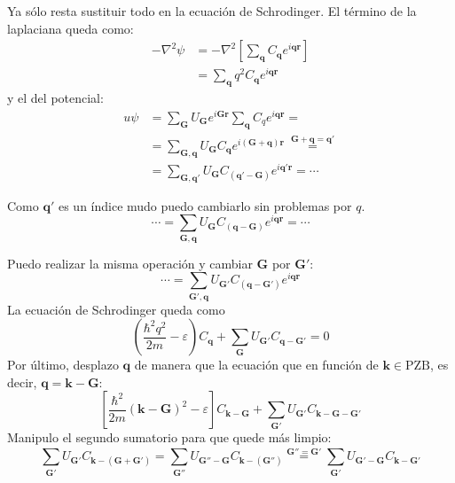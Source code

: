 Ya sólo resta sustituir todo en la ecuación de Schrodinger. El término
de la laplaciana queda como:
\begin{equation}
  \begin{split}
  -\nabla^2 \psi &= -\nabla^2 \left[ \sum_{\mathbf{q}} C_\mathbf{q}
    e^{i \mathbf{q} \mathbf{r}} \right] \\
  &= \sum_{\mathbf{q}} q^2 C_\mathbf{q} e^{i \mathbf{q} \mathbf{r}}
  \end{split}
\end{equation}
y el del potencial:
\begin{equation}
  \begin{split}
    u\psi &= \sum_{\mathbf{G}} U_\mathbf{G} e^{i \mathbf{G} \mathbf{r}}
    \sum_{\mathbf{q}} C_q e^{i \mathbf{q} \mathbf{r}} = \\ &=
    \sum_{\mathbf{G}, \mathbf{q}} U_\mathbf{G} C_\mathbf{q} e^{i(
      \mathbf{G} + \mathbf{q}) \mathbf{r}} \
    \stackrel{\mathbf{G}+\mathbf{q} = \mathbf{q'}}{=} \\
    &=\sum_{\mathbf{G}, \mathbf{q'}} U_\mathbf{G}
    C_{(\mathbf{q'}-\mathbf{G})} e^{i \mathbf{q'}\mathbf{r}} = \cdots
  \end{split}
\end{equation}

Como $\mathbf{q'}$ es un índice mudo puedo cambiarlo sin problemas por $q$.
\begin{equation}
  \cdots = \sum_{\mathbf{G}, \mathbf{q}} U_\mathbf{G}
  C_{(\mathbf{q}-\mathbf{G})} e^{i \mathbf{q} \mathbf{r}} = \cdots
\end{equation}

Puedo realizar la misma operación y cambiar $\mathbf{G}$ por
$\mathbf{G'}$:
\begin{equation}
  \cdots = \sum_{\mathbf{G'} , \mathbf{q}} U_\mathbf{G'}
  C_{(\mathbf{q}-\mathbf{G'})} e^{i \mathbf{q} \mathbf{r}}
\end{equation}
La ecuación de Schrodinger queda como
\begin{equation}
    \left( \frac{\hbar^2 q^2}{2m} - \varepsilon \right) C_\mathbf{q} +
    \sum_{\mathbf{G}} U_\mathbf{G'} C_{\mathbf{q}-\mathbf{G'}} = 0
\end{equation}
Por último, desplazo $\mathbf{q}$ de manera que la ecuación que en
función de $\mathbf{k}\in
\text{PZB}$, es decir, $\mathbf{q} = \mathbf{k} - \mathbf{G}$:
\begin{equation}
    \left[ \frac{\hbar^2}{2m} (\mathbf{k}-\mathbf{G})^2-\varepsilon
    \right]C_{\mathbf{k}-\mathbf{G}} + \sum_{\mathbf{G'}}
    U_\mathbf{G'} C_{\mathbf{k}-\mathbf{G}-\mathbf{G'}}
\end{equation}
Manipulo el segundo sumatorio para que quede más limpio:
\begin{equation}
  \sum_{\mathbf{G'}} U_\mathbf{G'}
  C_{\mathbf{k}-(\mathbf{G}+\mathbf{G'})} = \sum_{\mathbf{G''}} U_{\mathbf{G''}-\mathbf{G}}
  C_{\mathbf{k}-(\mathbf{G''})} \stackrel{\mathbf{G''}=\mathbf{G'}}{=}
  \sum_{\mathbf{G'}}U_{ \mathbf{G'}-\mathbf{G} } C_{\mathbf{k}-\mathbf{G'}}
\end{equation}

